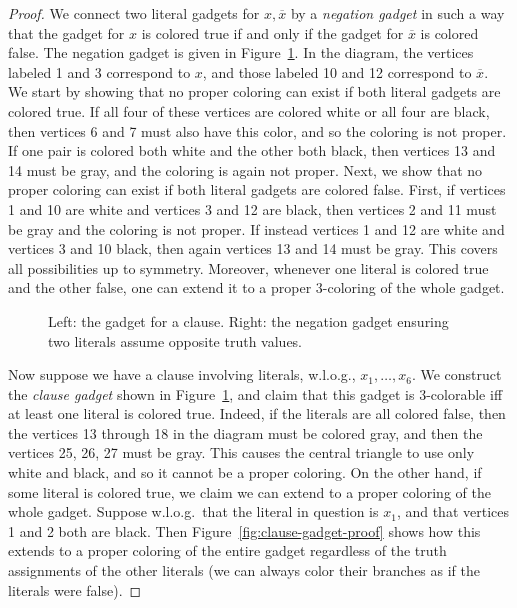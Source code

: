 \documentclass{llncs}
\begin{document}
\begin{proof}
We connect two literal gadgets for $x, \overline{x}$ by a \emph{negation
gadget} in such a way that the gadget for $x$ is colored true if and only if
the gadget for $\overline{x}$ is colored false. The negation gadget is given in
Figure~\ref{fig:clause-and-negation-gadget}. In the diagram, the vertices
labeled 1 and 3 correspond to $x$, and those labeled 10 and 12 correspond to
$\overline{x}$. We start by showing that no proper coloring can exist if both
literal gadgets are colored true. If all four of these vertices are colored
white or all four are black, then vertices 6 and 7 must also have this color,
and so the coloring is not proper. If one pair is colored both white and the
other both black, then vertices 13 and 14 must be gray, and the coloring is
again not proper.  Next, we show that no proper coloring can exist if both
literal gadgets are colored false. First, if vertices 1 and 10 are white and
vertices 3 and 12 are black, then vertices 2 and 11 must be gray and the
coloring is not proper. If instead vertices 1 and 12 are white and vertices 3
and 10 black, then again vertices 13 and 14 must be gray. This covers all
possibilities up to symmetry.  Moreover, whenever one literal is colored true
and the other false, one can extend it to a proper 3-coloring of the whole
gadget. 

\begin{figure}
\centering
{}
\caption{Left: the gadget for a clause. Right: the negation gadget ensuring two
literals assume opposite truth values.} 
\label{fig:clause-and-negation-gadget}
\end{figure}


Now suppose we have a clause involving literals, w.l.o.g., $x_1, \dots, x_6$.
We construct the \emph{clause gadget} shown in
Figure~\ref{fig:clause-and-negation-gadget}, and claim that this gadget is
3-colorable iff at least one literal is colored true. Indeed, if the literals
are all colored false, then the vertices  13 through 18 in the diagram must be
colored gray, and then the vertices 25, 26, 27 must be gray. This causes the
central triangle to use only white and black, and so it cannot be a proper
coloring. On the other hand, if some literal is colored true, we claim we can
extend to a proper coloring of the whole gadget.  Suppose w.l.o.g.\ that the
literal in question is $x_1$, and that vertices 1 and 2 both are black. Then
Figure~\ref{fig:clause-gadget-proof} shows how this extends to a proper
coloring of the entire gadget regardless of the truth assignments of the other
literals (we can always color their branches as if the literals were false). 


\end{proof}
\end{document}
